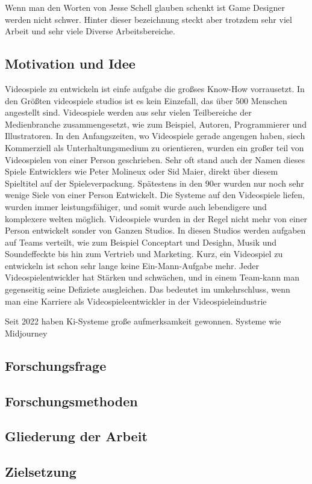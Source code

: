 \documentclass[12pt,a4paper,bibliography=totocnumbered,listof=totocnumbered]{scrartcl}
\begin{document}
Wenn man den Worten von Jesse Schell glauben schenkt ist Game Designer werden nicht schwer. Hinter dieser bezeichnung steckt aber trotzdem sehr viel Arbeit und sehr viele Diverse Arbeitsbereiche.
\subsection{Motivation und Idee}
Videospiele zu entwickeln ist einfe aufgabe die großses Know-How vorrausetzt. In den Größten videospiele studios ist es kein Einzefall, das über 500 Menschen angestellt sind. Videospiele werden aus sehr vielen Teilbereiche der Medienbranche zusammengesetzt, wie zum Beispiel, Autoren, Programmierer und Illustratoren.
In den Anfangszeiten, wo Videospiele gerade angengen haben, siech Kommerziell als Unterhaltungsmedium zu orientieren, wurden ein großer teil von Videospielen von einer Person geschrieben. Sehr oft stand auch der Namen dieses Spiele Entwicklers wie Peter Molineux oder Sid Maier, direkt über diesem Spieltitel auf der Spieleverpackung.
Spätestens in den 90er wurden nur noch sehr wenige Siele von einer Person Entwickelt. Die Systeme auf den Videospiele liefen, wurden immer leistungsfähiger, und somit wurde auch lebendigere und komplexere welten möglich. Videospiele wurden in der Regel nicht mehr von einer Person entwickelt sonder von Ganzen Studios. In diesen Studios werden aufgaben auf Teams verteilt, wie zum Beispiel Conceptart und Desighn, Musik und Soundeffeckte bis hin zum Vertrieb und Marketing.
Kurz, ein Videospiel zu entwickeln ist schon sehr lange keine Ein-Mann-Aufgabe mehr.
Jeder Videospielentwickler hat Stärken und schwächen, und in einem Team-kann man gegenseitig seine Defiziete ausgleichen. Das bedeutet im umkehrschluss, wenn man eine Karriere als Videospieleentwickler in der Videospieleindustrie

Seit 2022 haben Ki-Systeme große aufmerksamkeit  gewonnen. Systeme wie Midjourney


\subsection{Forschungsfrage}
\subsection{Forschungsmethoden}
\subsection{Gliederung der Arbeit}
\subsection{Zielsetzung}
\end{document}
